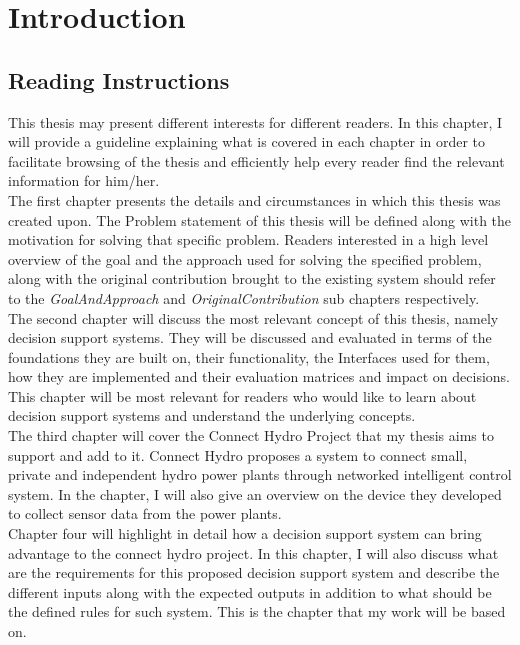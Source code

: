 \chapter{Introduction}
\label{ChapterOne}
\section{Reading Instructions}
\label{sec:Reading Instructions}
\indent This thesis may present different interests for different readers. In this chapter, I will provide a guideline explaining what is covered in each chapter in order to facilitate browsing of the thesis and efficiently help every reader find the relevant information for him/her. \\
\indent The first chapter presents the details and circumstances in which this thesis was created upon. The Problem statement of this thesis will be defined along with the motivation for solving that specific problem. Readers interested in a high level overview of the goal and the approach used for solving the specified problem, along with the original contribution brought to the existing system should refer to the \textit{GoalAndApproach} and \textit{OriginalContribution} sub chapters respectively.\\
\indent The second chapter will discuss the most relevant concept of this thesis, namely decision support systems. They will be discussed and evaluated in terms of the foundations they are built on, their functionality, the Interfaces used for them, how they are implemented and their evaluation matrices and impact on decisions. This chapter will be most relevant for readers who would like to learn about decision support systems and understand the underlying concepts.\\
\indent The third chapter will cover the Connect Hydro Project that my thesis aims to support and add to it. Connect Hydro proposes a system to connect small, private and independent hydro power plants through networked intelligent control system. In the chapter, I will also give an overview on the device they developed to collect sensor data from the power plants.\\
\indent Chapter four will highlight in detail how a decision support system can bring advantage to the connect hydro project. In this chapter, I will also discuss what are the requirements for this proposed decision support system and describe the different inputs along with the expected outputs in addition to what should be the defined rules for such system. This is the chapter that my work will be based on.\\
